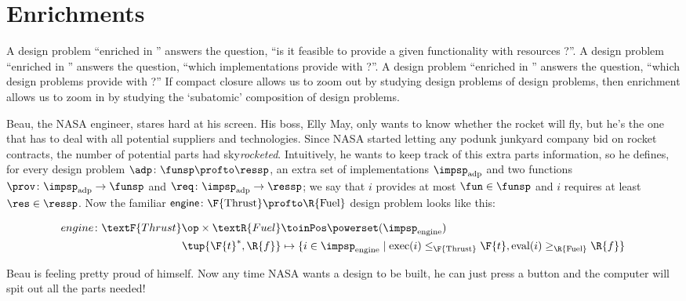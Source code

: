 

\section{Enrichments}
\label{sec:enriched}


A design problem ``enriched in \Bool'' answers the question, ``is it feasible to provide a given functionality \fun with resources \res?''.
A design problem ``enriched in \Set'' answers the question, ``which implementations provide \fun with \res?''.
A design problem ``enriched in \DP'' answers the question, ``which design problems provide \fun with \res?'' If compact closure allows us to zoom out by studying design problems of design problems, then enrichment allows us to zoom in by studying the `subatomic' composition of design problems.

\begin{example}
    \label{ex:dpi_example}
    Beau, the NASA engineer, stares hard at his screen.
    His boss, Elly May, only wants to know whether the rocket will fly, but he's the one that has to deal with all potential suppliers and technologies.
    Since NASA started letting any podunk junkyard company bid on rocket contracts, the number of potential parts had sky\emph{rocketed}.
    Intuitively, he wants to keep track of this extra parts information, so he defines, for every design problem $\adp \colon \funsp \profto \ressp$, an extra set of implementations $\impsp_\text{adp}$ and two functions $\prov\colon \impsp_\text{adp} \to \funsp$ and  $\req\colon \impsp_\text{adp} \to \ressp$; we say that $i$ provides at most $\fun \in \funsp$ and $i$ requires at least $\res \in \ressp$.
    Now the familiar $\mathsf{engine} \colon \F{\text{Thrust}} \profto \R{\text{Fuel}}$ design problem looks like this:
    \begin{widepar}
        \begin{equation*}
            \begin{aligned}
                engine \colon \textF{Thrust}\op \times \textR{Fuel} &\toinPos \powerset(\impsp_\text{engine}) \\
                \tup{\F{t}^*,\R{f}} &\mapsto \{ i \in \impsp_\text{engine} \mid \text{exec}(i) \leq_\F{\text{Thrust}} \F{t}, \text{eval}(i) \geq_\R{\text{Fuel}} \R{f} \}
            \end{aligned}
        \end{equation*}
    \end{widepar}
    Beau is feeling pretty proud of himself.
    Now any time NASA wants a design to be built, he can just press a button and the computer will spit out all the parts needed!
\end{example}

